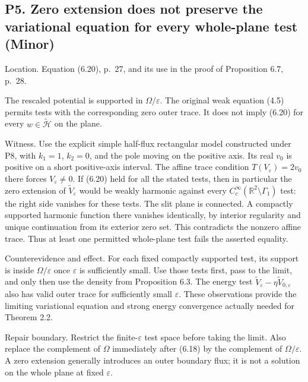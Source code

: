 \documentclass[10pt]{article}
\begin{document}
\subsection*{P5. Zero extension does not preserve the variational equation for every whole-plane test (Minor)}
Location. Equation (6.20), p. 27, and its use in the proof of Proposition 6.7, p. 28.\par
The rescaled potential is supported in \(\Omega/\varepsilon\). The original weak equation (4.5) permits tests with the corresponding zero outer trace. It does not imply (6.20) for every \(w\in\widetilde{\mathcal H}\) on the plane.\par
Witness. Use the explicit simple half-flux rectangular model constructed under P8, with \(k_1=1\), \(k_2=0\), and the pole moving on the positive axis. Its real \(v_0\) is positive on a short positive-axis interval. The affine trace condition \(T(V_\varepsilon)=2v_0\) there forces \(V_\varepsilon\ne0\). If (6.20) held for all the stated tests, then in particular the zero extension of \(\widetilde V_\varepsilon\) would be weakly harmonic against every \(C_c^\infty(\mathbb R^2\setminus\Gamma_1)\) test: the right side vanishes for these tests. The slit plane is connected. A compactly supported harmonic function there vanishes identically, by interior regularity and unique continuation from its exterior zero set. This contradicts the nonzero affine trace. Thus at least one permitted whole-plane test fails the asserted equality.\par
Counterevidence and effect. For each fixed compactly supported test, its support is inside \(\Omega/\varepsilon\) once \(\varepsilon\) is sufficiently small. Use those tests first, pass to the limit, and only then use the density from Proposition 6.3. The energy test \(\widetilde V_\varepsilon-\eta\widetilde V_{0,\varepsilon}\) also has valid outer trace for sufficiently small \(\varepsilon\). These observations provide the limiting variational equation and strong energy convergence actually needed for Theorem 2.2.\par
Repair boundary. Restrict the finite-\(\varepsilon\) test space before taking the limit. Also replace the complement of \(\Omega\) immediately after (6.18) by the complement of \(\Omega/\varepsilon\). A zero extension generally introduces an outer boundary flux; it is not a solution on the whole plane at fixed \(\varepsilon\).\par
\end{document}
